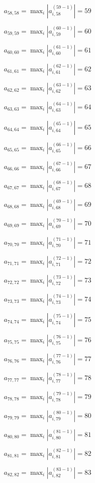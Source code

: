\documentclass[a4paper,12pt]{article}
\begin{document}
$a _{ 58, 58 } =  \max _i |a _{ i, 58 } ^{ (59 - 1) } | = 59$

$a _{ 59, 59 } =  \max _i |a _{ i, 59 } ^{ (60 - 1) } | = 60$

$a _{ 60, 60 } =  \max _i |a _{ i, 60 } ^{ (61 - 1) } | = 61$

$a _{ 61, 61 } =  \max _i |a _{ i, 61 } ^{ (62 - 1) } | = 62$

$a _{ 62, 62 } =  \max _i |a _{ i, 62 } ^{ (63 - 1) } | = 63$

$a _{ 63, 63 } =  \max _i |a _{ i, 63 } ^{ (64 - 1) } | = 64$

$a _{ 64, 64 } =  \max _i |a _{ i, 64 } ^{ (65 - 1) } | = 65$

$a _{ 65, 65 } =  \max _i |a _{ i, 65 } ^{ (66 - 1) } | = 66$

$a _{ 66, 66 } =  \max _i |a _{ i, 66 } ^{ (67 - 1) } | = 67$

$a _{ 67, 67 } =  \max _i |a _{ i, 67 } ^{ (68 - 1) } | = 68$

$a _{ 68, 68 } =  \max _i |a _{ i, 68 } ^{ (69 - 1) } | = 69$

$a _{ 69, 69 } =  \max _i |a _{ i, 69 } ^{ (70 - 1) } | = 70$

$a _{ 70, 70 } =  \max _i |a _{ i, 70 } ^{ (71 - 1) } | = 71$

$a _{ 71, 71 } =  \max _i |a _{ i, 71 } ^{ (72 - 1) } | = 72$

$a _{ 72, 72 } =  \max _i |a _{ i, 72 } ^{ (73 - 1) } | = 73$

$a _{ 73, 73 } =  \max _i |a _{ i, 73 } ^{ (74 - 1) } | = 74$

$a _{ 74, 74 } =  \max _i |a _{ i, 74 } ^{ (75 - 1) } | = 75$

$a _{ 75, 75 } =  \max _i |a _{ i, 75 } ^{ (76 - 1) } | = 76$

$a _{ 76, 76 } =  \max _i |a _{ i, 76 } ^{ (77 - 1) } | = 77$

$a _{ 77, 77 } =  \max _i |a _{ i, 77 } ^{ (78 - 1) } | = 78$

$a _{ 78, 78 } =  \max _i |a _{ i, 78 } ^{ (79 - 1) } | = 79$

$a _{ 79, 79 } =  \max _i |a _{ i, 79 } ^{ (80 - 1) } | = 80$

$a _{ 80, 80 } =  \max _i |a _{ i, 80 } ^{ (81 - 1) } | = 81$

$a _{ 81, 81 } =  \max _i |a _{ i, 81 } ^{ (82 - 1) } | = 82$

$a _{ 82, 82 } =  \max _i |a _{ i, 82 } ^{ (83 - 1) } | = 83$
\end{document}
